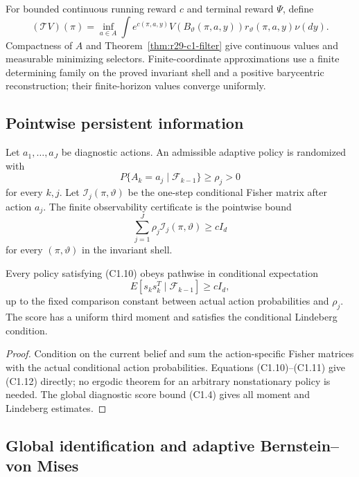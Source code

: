For bounded continuous running reward $c$ and terminal reward $\Psi$, define
\[
 (\mathcal TV)(\pi)=\inf_{a\in A}
 \int e^{c(\pi,a,y)}V(B_\vartheta(\pi,a,y))
 r_\vartheta(\pi,a,y)\nu(dy).                             \tag{C1.9}
\]
Compactness of $A$ and Theorem~\ref{thm:r29-c1-filter} give continuous values
and measurable minimizing selectors.  Finite-coordinate approximations use a
finite determining family on the proved invariant shell and a positive
barycentric reconstruction; their finite-horizon values converge uniformly.

\subsection{Pointwise persistent information}

Let $a_1,\ldots,a_J$ be diagnostic actions.  An admissible adaptive policy is
randomized with
\[
 P\{A_k=a_j\mid\mathcal F_{k-1}\}\ge\rho_j>0             \tag{C1.10}
\]
for every $k,j$.  Let
$\mathcal I_j(\pi,\vartheta)$ be the one-step conditional Fisher matrix after
action $a_j$.  The finite observability certificate is the pointwise bound
\[
 \sum_{j=1}^{J}\rho_j\mathcal I_j(\pi,\vartheta)\ge cI_d                 \tag{C1.11}
\]
for every $(\pi,\vartheta)$ in the invariant shell.

\begin{theorem}
\label{thm:r29-c1-information}
Every policy satisfying (C1.10) obeys pathwise in conditional expectation
\[
 E[s_ks_k^T\mid\mathcal F_{k-1}]
 \ge cI_d,                                                \tag{C1.12}
\]
up to the fixed comparison constant between actual action probabilities and
$\rho_j$.  The score has a uniform third moment and satisfies the conditional
Lindeberg condition.
\end{theorem}

\begin{proof}
Condition on the current belief and sum the action-specific Fisher matrices
with the actual conditional action probabilities.  Equations (C1.10)--(C1.11)
give (C1.12) directly; no ergodic theorem for an arbitrary nonstationary
policy is needed.  The global diagnostic score bound (C1.4) gives all moment
and Lindeberg estimates.
\end{proof}

\subsection{Global identification and adaptive Bernstein--von Mises}

